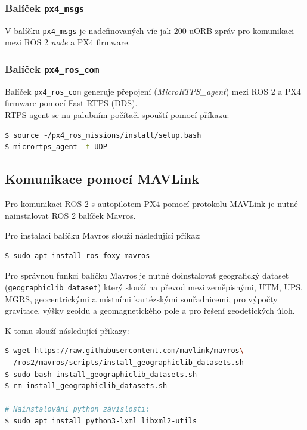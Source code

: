 \subsubsection{Balíček \texttt{px4\_msgs}}

V balíčku \texttt{px4\_msgs} je nadefinovaných víc jak 200 uORB zpráv pro komunikaci mezi ROS 2 \textit{node} a PX4 firmware.

\subsubsection{Balíček \texttt{px4\_ros\_com}}

Balíček \texttt{px4\_ros\_com} generuje přepojení (\textit{MicroRTPS\_agent}) mezi ROS 2 a PX4 firmware pomocí Fast RTPS (\acs{DDS}).\\

\acs{RTPS} agent se na palubním počítači spouští pomocí příkazu:

\begin{lstlisting}[language=bash]
$ source ~/px4_ros_missions/install/setup.bash
$ micrortps_agent -t UDP
\end{lstlisting}

\subsection{Komunikace pomocí MAVLink}

Pro komunikaci ROS 2 s autopilotem PX4 pomocí protokolu MAVLink je nutné nainstalovat ROS 2 balíček Mavros.

Pro instalaci balíčku Mavros slouží následující příkaz:

\begin{lstlisting}[language=bash]
$ sudo apt install ros-foxy-mavros
\end{lstlisting}

Pro správnou funkci balíčku Mavros je nutné doinstalovat geografický dataset (\texttt{geographiclib dataset}) který slouží na převod mezi zeměpisnými, UTM, UPS, MGRS, geocentrickými a místními kartézskými souřadnicemi, pro výpočty gravitace, výšky geoidu a geomagnetického pole a pro řešení geodetických úloh. \cite{GEOLIB}

K tomu slouží následující přikazy:

\begin{lstlisting}[language=bash]
$ wget https://raw.githubusercontent.com/mavlink/mavros\
  /ros2/mavros/scripts/install_geographiclib_datasets.sh
$ sudo bash install_geographiclib_datasets.sh
$ rm install_geographiclib_datasets.sh

# Nainstalování python závislosti:
$ sudo apt install python3-lxml libxml2-utils
\end{lstlisting}
